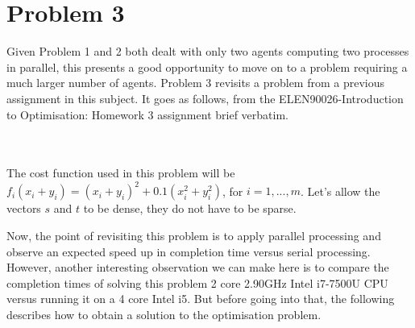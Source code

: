 \documentclass[12pt]{article}
\begin{document}
\section*{Problem 3}

Given Problem 1 and 2 both dealt with only two agents computing two processes in parallel, this presents a good opportunity to move on to a problem requiring a much larger number of agents. Problem 3 revisits a problem from a previous assignment in this subject. It goes as follows, from the ELEN90026-Introduction to Optimisation: Homework 3 assignment brief verbatim.

\noindent{}\\\\

The cost function used in this problem will be $f_i(x_i+y_i)=(x_i+y_i)^2+0.1(x_i^2+y_i^2)$, for $i=1,...,m$. Let's allow the vectors $s$ and $t$ to be dense, they do not have to be sparse.

Now, the point of revisiting this problem is to apply parallel processing and observe an expected speed up in completion time versus serial processing. However, another interesting observation we can make here is to compare the completion times of solving this problem 2 core 2.90GHz Intel i7-7500U CPU versus running it on a 4 core Intel i5. But before going into that, the following describes how to obtain a solution to the optimisation problem.
\end{document}
